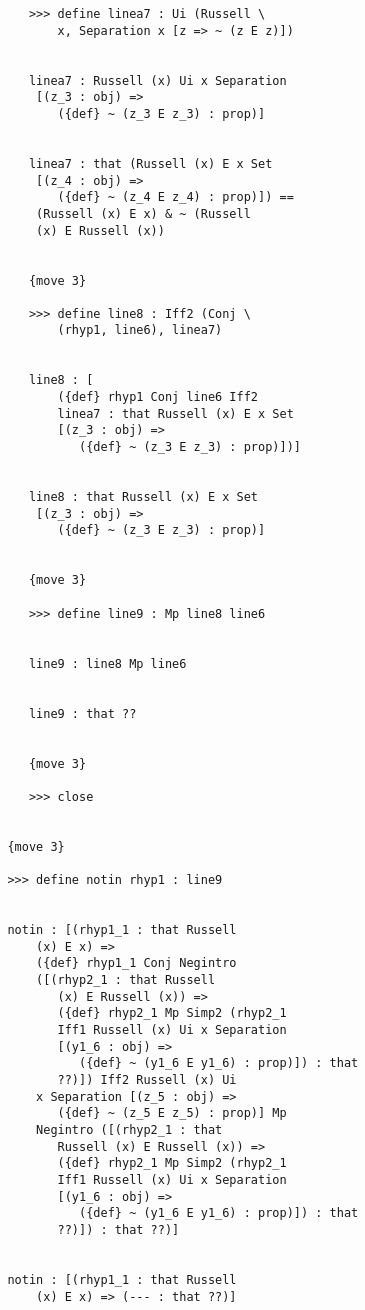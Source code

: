 \documentclass[12pt]{article}
\begin{document}
\begin{verbatim}
            >>> define linea7 : Ui (Russell \
                x, Separation x [z => ~ (z E z)])


            linea7 : Russell (x) Ui x Separation 
             [(z_3 : obj) => 
                ({def} ~ (z_3 E z_3) : prop)]


            linea7 : that (Russell (x) E x Set 
             [(z_4 : obj) => 
                ({def} ~ (z_4 E z_4) : prop)]) == 
             (Russell (x) E x) & ~ (Russell 
             (x) E Russell (x))


            {move 3}

            >>> define line8 : Iff2 (Conj \
                (rhyp1, line6), linea7)


            line8 : [
                ({def} rhyp1 Conj line6 Iff2 
                linea7 : that Russell (x) E x Set 
                [(z_3 : obj) => 
                   ({def} ~ (z_3 E z_3) : prop)])]


            line8 : that Russell (x) E x Set 
             [(z_3 : obj) => 
                ({def} ~ (z_3 E z_3) : prop)]


            {move 3}

            >>> define line9 : Mp line8 line6


            line9 : line8 Mp line6


            line9 : that ??


            {move 3}

            >>> close


         {move 3}

         >>> define notin rhyp1 : line9


         notin : [(rhyp1_1 : that Russell 
             (x) E x) => 
             ({def} rhyp1_1 Conj Negintro 
             ([(rhyp2_1 : that Russell 
                (x) E Russell (x)) => 
                ({def} rhyp2_1 Mp Simp2 (rhyp2_1 
                Iff1 Russell (x) Ui x Separation 
                [(y1_6 : obj) => 
                   ({def} ~ (y1_6 E y1_6) : prop)]) : that 
                ??)]) Iff2 Russell (x) Ui 
             x Separation [(z_5 : obj) => 
                ({def} ~ (z_5 E z_5) : prop)] Mp 
             Negintro ([(rhyp2_1 : that 
                Russell (x) E Russell (x)) => 
                ({def} rhyp2_1 Mp Simp2 (rhyp2_1 
                Iff1 Russell (x) Ui x Separation 
                [(y1_6 : obj) => 
                   ({def} ~ (y1_6 E y1_6) : prop)]) : that 
                ??)]) : that ??)]


         notin : [(rhyp1_1 : that Russell 
             (x) E x) => (--- : that ??)]



\end{verbatim}
\end{document}
